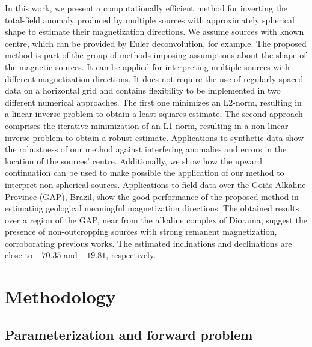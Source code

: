 \documentclass[journal abbreviation, npg]{copernicus}
\begin{document}
In this work, we present a computationally efficient method for inverting the
total-field anomaly produced by multiple sources with approximately spherical
shape to estimate their magnetization directions. We assume sources with
known centre, which can be provided by Euler deconvolution, for example. The
proposed method is part of the group of methods imposing assumptions about
the shape of the magnetic sources. It can be applied for interpreting
multiple sources with different magnetization directions. It does not require
the use of regularly spaced data on a horizontal grid and contains
flexibility to be implemented in two different numerical approaches. The
first one minimizes an L2-norm, resulting in a linear inverse problem to
obtain a least-squares estimate. The second approach comprises the iterative
minimization of an L1-norm, resulting in a non-linear inverse problem to
obtain a robust estimate. Applications to synthetic data show the robustness
of our method against interfering anomalies and errors in the location of the
sources' centre. Additionally, we show how the upward continuation can be
used to make possible the application of our method to interpret
non-spherical sources. Applications to field data over the Goi\'{a}s Alkaline
Province (GAP), Brazil, show the good performance of the proposed method in
estimating geological meaningful magnetization directions. The obtained
results over a region of the GAP, near from the alkaline complex of Diorama,
suggest the presence of non-outcropping sources with strong remanent
magnetization, corroborating previous works. The estimated inclinations and
declinations are close to $-70.35${\degree} and $-19.81${\degree},
respectively.

\section{Methodology}

\subsection{Parameterization and forward problem}
\end{document}
